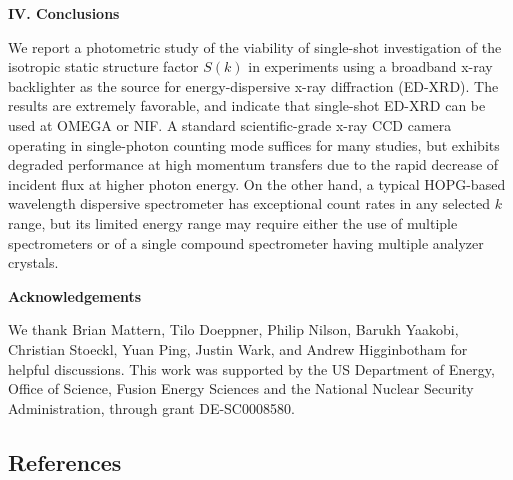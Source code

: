 \textbf{IV. Conclusions}

We report a photometric study of the viability of single-shot
investigation of the isotropic static structure factor \(S(k)\) in
experiments using a broadband x-ray backlighter as the source for
energy-dispersive x-ray diffraction (ED-XRD). The results are extremely
favorable, and indicate that single-shot ED-XRD can be used at OMEGA or
NIF. A standard scientific-grade x-ray CCD camera operating in
single-photon counting mode suffices for many studies, but exhibits
degraded performance at high momentum transfers due to the rapid
decrease of incident flux at higher photon energy. On the other hand, a
typical HOPG-based wavelength dispersive spectrometer has exceptional
count rates in any selected \(k\) range, but its limited energy range
may require either the use of multiple spectrometers or of a single
compound spectrometer having multiple analyzer crystals.

\textbf{Acknowledgements}

We thank Brian Mattern, Tilo Doeppner, Philip Nilson, Barukh Yaakobi,
Christian Stoeckl, Yuan Ping, Justin Wark, and Andrew Higginbotham for
helpful discussions. This work was supported by the US Department of
Energy, Office of Science, Fusion Energy Sciences and the National
Nuclear Security Administration, through grant DE-SC0008580.\textbf{\\}

\subsection{References}\label{references}


